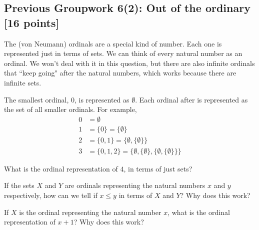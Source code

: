 \documentclass[12pt]{exam}
\begin{document}
\subsection*{Previous Groupwork 6(2): Out of the ordinary [16 points]}
The (von Neumann) ordinals are a special kind of number. Each one is represented just in terms of sets. We can think of every natural number as an ordinal. We won't deal with it in this question, but there are also infinite ordinals that ``keep going" after the natural numbers, which works because there are infinite sets.

The smallest ordinal, $0$, is represented as $\emptyset$. Each ordinal after is represented as the set of all smaller ordinals. For example,
\begin{align*}
    0 &= \emptyset\\
    1 &= \{ 0 \} = \{ \emptyset \}\\
    2 &= \{ 0, 1 \} = \{ \emptyset, \{ \emptyset \} \}\\
    3 &= \{ 0, 1, 2 \} = \{ \emptyset, \{ \emptyset \}, \{ \emptyset, \{ \emptyset \} \} \}
\end{align*}

\begin{qparts}
    \item What is the ordinal representation of $4$, in terms of just sets?

    \item If the sets $X$ and $Y$ are ordinals representing the natural numbers $x$ and $y$ respectively, how can we tell if $x \le y$ in terms of $X$ and $Y$? Why does this work?

    \item If $X$ is the ordinal representing the natural number $x$, what is the ordinal representation of $x+1$? Why does this work?
\end{qparts}
\end{document}
